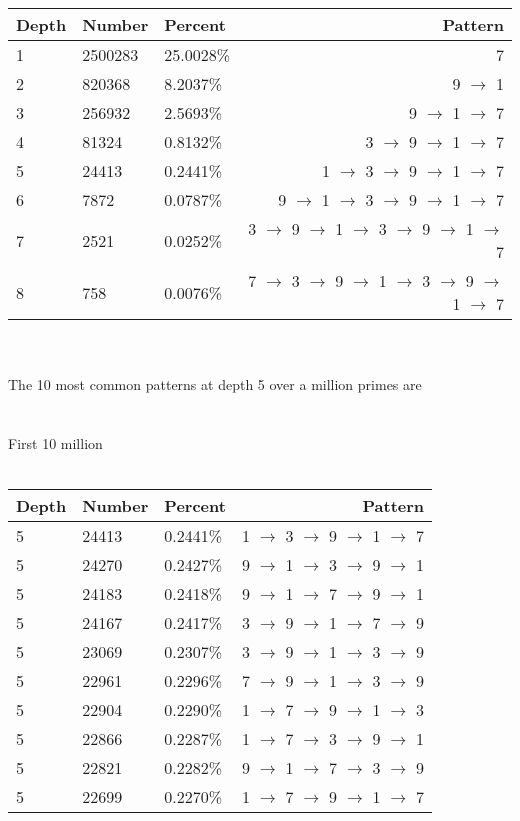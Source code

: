 \documentclass[13pt]{article}
\begin{document}
\begin{tabular}{ l l l r }
  Depth & Number & Percent & Pattern \\
  \hline
  1 & 2500283 & 25.0028\% & 7\\
  2 & 820368 & 8.2037\% & 9 $\rightarrow$ 1\\
  3 & 256932 & 2.5693\% & 9 $\rightarrow$ 1 $\rightarrow$ 7\\
  4 & 81324 & 0.8132\% & 3 $\rightarrow$ 9 $\rightarrow$ 1 $\rightarrow$ 7\\
  5 & 24413 & 0.2441\% & 1 $\rightarrow$ 3 $\rightarrow$ 9 $\rightarrow$ 1 $\rightarrow$ 7\\
  6 & 7872 & 0.0787\% & 9 $\rightarrow$ 1 $\rightarrow$ 3 $\rightarrow$ 9 $\rightarrow$ 1 $\rightarrow$ 7\\
  7 & 2521 & 0.0252\% & 3 $\rightarrow$ 9 $\rightarrow$ 1 $\rightarrow$ 3 $\rightarrow$ 9 $\rightarrow$ 1 $\rightarrow$ 7\\
  8 & 758 & 0.0076\% & 7 $\rightarrow$ 3 $\rightarrow$ 9 $\rightarrow$ 1 $\rightarrow$ 3 $\rightarrow$ 9 $\rightarrow$ 1 $\rightarrow$ 7\\
  \end{tabular}
\\\\The 10 most common patterns at depth 5 over a million primes are\\\\
\\First 10 million\\\\
\begin{tabular}{ l l l r }
  Depth & Number & Percent & Pattern \\
  \hline
    5 & 24413 & 0.2441\% & 1 $\rightarrow$ 3 $\rightarrow$ 9 $\rightarrow$ 1 $\rightarrow$ 7\\
    5 & 24270 & 0.2427\% & 9 $\rightarrow$ 1 $\rightarrow$ 3 $\rightarrow$ 9 $\rightarrow$ 1\\
    5 & 24183 & 0.2418\% & 9 $\rightarrow$ 1 $\rightarrow$ 7 $\rightarrow$ 9 $\rightarrow$ 1\\
    5 & 24167 & 0.2417\% & 3 $\rightarrow$ 9 $\rightarrow$ 1 $\rightarrow$ 7 $\rightarrow$ 9\\
    5 & 23069 & 0.2307\% & 3 $\rightarrow$ 9 $\rightarrow$ 1 $\rightarrow$ 3 $\rightarrow$ 9\\
    5 & 22961 & 0.2296\% & 7 $\rightarrow$ 9 $\rightarrow$ 1 $\rightarrow$ 3 $\rightarrow$ 9\\
    5 & 22904 & 0.2290\% & 1 $\rightarrow$ 7 $\rightarrow$ 9 $\rightarrow$ 1 $\rightarrow$ 3\\
    5 & 22866 & 0.2287\% & 1 $\rightarrow$ 7 $\rightarrow$ 3 $\rightarrow$ 9 $\rightarrow$ 1\\
    5 & 22821 & 0.2282\% & 9 $\rightarrow$ 1 $\rightarrow$ 7 $\rightarrow$ 3 $\rightarrow$ 9\\
    5 & 22699 & 0.2270\% & 1 $\rightarrow$ 7 $\rightarrow$ 9 $\rightarrow$ 1 $\rightarrow$ 7\\
  \end{tabular}
\end{document}
